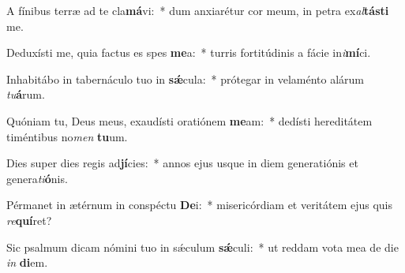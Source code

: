 \item A fínibus terræ ad te cla\textbf{má}vi:~* dum anxiarétur cor meum, in petra ex\textit{al}\textbf{tás}\textbf{ti} me.
\item Deduxísti me, quia factus es spes \textbf{me}a:~* turris fortitúdinis a fácie in\textit{i}\textbf{mí}ci.
\item Inhabitábo in tabernáculo tuo in \textbf{sǽ}cula:~* prótegar in velaménto alárum \textit{tu}\textbf{á}rum.
\item Quóniam tu, Deus meus, exaudísti oratiónem \textbf{me}am:~* dedísti hereditátem timéntibus no\textit{men} \textbf{tu}um.
\item Dies super dies regis ad\textbf{jí}cies:~* annos ejus usque in diem generatiónis et genera\textit{ti}\textbf{ó}nis.
\item Pérmanet in ætérnum in conspéctu \textbf{De}i:~* misericórdiam et veritátem ejus quis \textit{re}\textbf{quí}ret?
\item Sic psalmum dicam nómini tuo in sǽculum \textbf{sǽ}culi:~* ut reddam vota mea de die \textit{in} \textbf{di}em.
